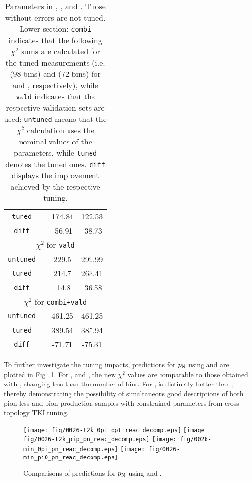\begin{table}[!htb]
\begin{tabular}{cccc}
        \texttt{tuned}           & & 174.84         & 122.53        \\
        \texttt{diff}            & & -56.91         & -38.73        \\
        \hline
        \multicolumn{4}{c}{$\chi^2$ \textrm{for} \texttt{vald}} \\
        \hline
        \texttt{untuned}    & & 229.5          & 299.99        \\
        \texttt{tuned}            & & 214.7          & 263.41        \\
        \texttt{diff}       & & -14.8          & -36.58        \\
        \hline
        \multicolumn{4}{c}{$\chi^2$ \textrm{for} \texttt{combi+vald}} \\
        \hline
        \texttt{untuned}    & &  461.25          &  461.25        \\
        \texttt{tuned}          &  & 389.54 & 385.94        \\
        \texttt{diff} & & -71.71         & -75.31  \\     
        \hline
        \hline
    \end{tabular}
    \caption{\label{tab:restunes}
    	Parameters in \gZero, \gC, and \gT. Those without errors are not tuned. Lower section: \texttt{combi} indicates that the following $\chi^2$ sums are calculated for the tuned measurements (i.e. \cbRedPar (98 bins) and \cbAllPar (72 bins) for \gC and \gT, respectively), while \texttt{vald} indicates that the respective validation sets are used; \texttt{untuned} means that the $\chi^2$ calculation uses the nominal values of the parameters, while \texttt{tuned} denotes the tuned ones. \texttt{diff} displays the improvement achieved by the respective tuning.  
    }
    \end{table}
    
    To further investigate the tuning impacts, predictions for $p_\textrm{N}$ using \gZero and \gC are plotted in Fig.~\ref{fig:g24-c-pn-reac}. 
    For \ttkzpi, \ttkpip and \minzpi, the new $\chi^2$ values are comparable to those obtained with \gZero, changing less than the number of bins. 
    For \minpiz, \gC is distinctly better than \gZero, thereby demonstrating the possibility of simultaneous good descriptions of both pion-less and pion production samples with constrained parameters from cross-topology TKI tuning.

    \begin{figure*} 
        \centering 		
        \texttt{[image: fig/0026-t2k\_0pi\_dpt\_reac\_decomp.eps]}
        \texttt{[image: fig/0026-t2k\_pip\_pn\_reac\_decomp.eps]}	
        \texttt{[image: fig/0026-min\_0pi\_pn\_reac\_decomp.eps]}
        \texttt{[image: fig/0026-min\_pi0\_pn\_reac\_decomp.eps]}
        \caption{\label{fig:g24-c-pn-reac}  
        Comparisons of predictions for $p_\textrm{N}$ using \gZero and \gC. 
        } 
    \end{figure*}

